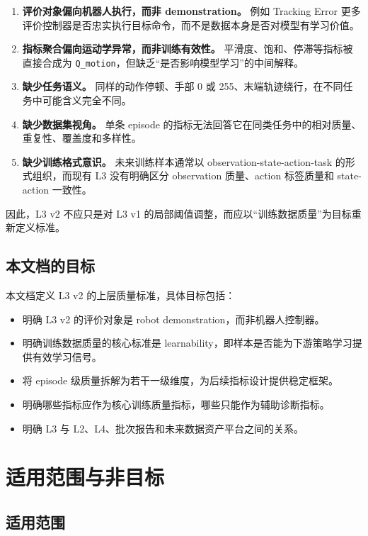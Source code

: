\documentclass[UTF8,zihao=-4]{ctexart}
\begin{document}
\begin{enumerate}
  \item \textbf{评价对象偏向机器人执行，而非 demonstration。} 例如 Tracking Error 更多评价控制器是否忠实执行目标命令，而不是数据本身是否对模型有学习价值。
  \item \textbf{指标聚合偏向运动学异常，而非训练有效性。} 平滑度、饱和、停滞等指标被直接合成为 \texttt{Q\_motion}，但缺乏“是否影响模型学习”的中间解释。
  \item \textbf{缺少任务语义。} 同样的动作停顿、手部 0 或 255、末端轨迹绕行，在不同任务中可能含义完全不同。
  \item \textbf{缺少数据集视角。} 单条 episode 的指标无法回答它在同类任务中的相对质量、重复性、覆盖度和多样性。
  \item \textbf{缺少训练格式意识。} 未来训练样本通常以 observation-state-action-task 的形式组织，而现有 L3 没有明确区分 observation 质量、action 标签质量和 state-action 一致性。
\end{enumerate}

因此，L3 v2 不应只是对 L3 v1 的局部阈值调整，而应以“训练数据质量”为目标重新定义标准。

\subsection{本文档的目标}

本文档定义 L3 v2 的上层质量标准，具体目标包括：

\begin{itemize}
  \item 明确 L3 v2 的评价对象是 robot demonstration，而非机器人控制器。
  \item 明确训练数据质量的核心标准是 learnability，即样本是否能为下游策略学习提供有效学习信号。
  \item 将 episode 级质量拆解为若干一级维度，为后续指标设计提供稳定框架。
  \item 明确哪些指标应作为核心训练质量指标，哪些只能作为辅助诊断指标。
  \item 明确 L3 与 L2、L4、批次报告和未来数据资产平台之间的关系。
\end{itemize}

\section{适用范围与非目标}

\subsection{适用范围}
\end{document}
